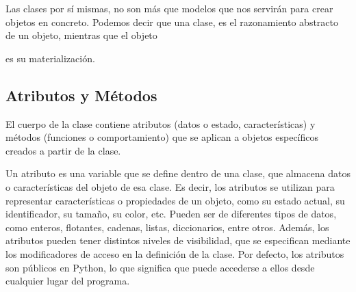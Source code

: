 Las clases por sí mismas, no son más que modelos que nos servirán para crear objetos en concreto. Podemos decir que una clase, es el razonamiento abstracto de un objeto, mientras que el objeto{{ es su materialización.
	
	\subsection{Atributos y Métodos}\label{atributos}
	
	
	
	
	El cuerpo de la clase contiene atributos (datos o estado, características) y métodos (funciones o comportamiento) que se aplican a objetos específicos creados a partir de la clase. 
	
	Un atributo es una variable que se define dentro de una clase, que almacena datos o características del  objeto de esa clase. Es decir, los atributos se utilizan para representar características o propiedades de un objeto, como su estado actual, su identificador, su tamaño, su color, etc. Pueden ser de diferentes tipos de datos, como enteros, flotantes, cadenas, listas, diccionarios, entre otros. Además, los atributos pueden tener distintos niveles de visibilidad, que se especifican mediante los modificadores de acceso en la definición de la clase. Por defecto, los atributos son públicos en Python, lo que significa que puede accederse a ellos desde cualquier lugar del programa.  
	
}}
